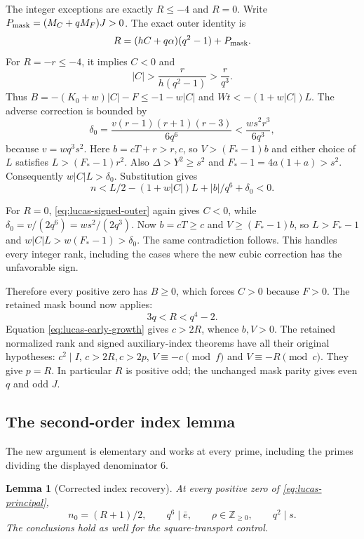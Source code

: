 \documentclass[11pt,letterpaper]{article}
\newtheorem{lemma}[theorem]{Lemma}
\theoremstyle{definition}
\theoremstyle{remark}
\begin{document}
The integer exceptions are exactly $R\le-4$ and $R=0$.  Write
$P_{\rm mask}=(M_C+qM_F)J>0$.  The exact outer identity is
\begin{equation}
 R=(hC+q\alpha)(q^2-1)+P_{\rm mask}.
 \label{eq:lucas-signed-outer}
\end{equation}
For $R=-r\le-4$, it implies $C<0$ and
\[
 |C|>\frac r{h(q^2-1)}>\frac r{q^3}.
\]
Thus $B=-(K_0+w)|C|-F\le-1-w|C|$ and
$Wt<-(1+w|C|)L$.  The adverse correction is bounded by
\begin{equation}
 \delta_0=\frac{v(r-1)(r+1)(r-3)}{6q^6}
          <\frac{ws^2r^3}{6q^3},
 \label{eq:lucas-adverse}
\end{equation}
because $v=wq^3s^2$.  Here $b=cT+r>r,c$, so
$V>(F_*-1)b$ and either choice of $L$ satisfies
$L>(F_*-1)r^2$.  Also $\Delta>Y^2\ge s^2$ and
$F_*-1=4a(1+a)>s^2$.  Consequently $w|C|L>\delta_0$.  Substitution gives
\[
 n<L/2-(1+w|C|)L+|b|/q^6+\delta_0<0.
\]

For $R=0$, \eqref{eq:lucas-signed-outer} again gives $C<0$, while
$\delta_0=v/(2q^6)=ws^2/(2q^3)$.  Now $b=cT\ge c$ and
$V\ge(F_*-1)b$, so $L>F_*-1$ and
$w|C|L>w(F_*-1)>\delta_0$.  The same contradiction follows.
This handles every integer rank, including the cases where the new cubic
correction has the unfavorable sign.

Therefore every positive zero has $B\ge0$, which forces $C>0$ because
$F>0$.  The retained mask bound now applies:
\begin{equation}
 3q<R<q^4-2.
 \label{eq:lucas-rank-box}
\end{equation}
Equation \eqref{eq:lucas-early-growth} gives $c>2R$, whence $b,V>0$.
The retained normalized rank and signed auxiliary-index theorems have all
their original hypotheses: $c^2\mid I$, $c>2R,c>2p$,
$V\equiv-c\pmod f$ and $V\equiv-R\pmod c$.  They give $p=R$.
In particular $R$ is positive odd; the unchanged mask parity gives even $q$
and odd $J$.

\subsection{The second-order index lemma}

The new argument is elementary and works at every prime, including the primes
dividing the displayed denominator $6$.

\begin{lemma}[Corrected index recovery]
\label{lem:lucas-corrected-index}
At every positive zero of \eqref{eq:lucas-principal},
\[
 n_0=(R+1)/2,\qquad q^6\mid\bar e,
 \qquad \rho\in\mathbb Z_{\ge0},\qquad q^2\mid s.
\]
The conclusions hold as well for the square-transport control.
\end{lemma}
\end{document}
